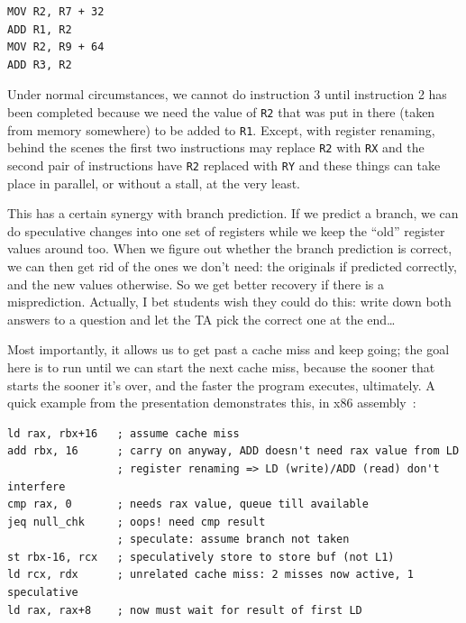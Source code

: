 \documentclass[a4paper]{report}
\begin{document}
\begin{verbatim}
MOV R2, R7 + 32
ADD R1, R2
MOV R2, R9 + 64
ADD R3, R2
\end{verbatim}

Under normal circumstances, we cannot do instruction 3 until instruction 2 has been completed because we need the value of \texttt{R2} that was put in there (taken from memory somewhere) to be added to \texttt{R1}. Except, with register renaming, behind the scenes the first two instructions may replace \texttt{R2} with \texttt{RX} and the second pair of instructions have \texttt{R2} replaced with \texttt{RY} and these things can take place in parallel, or without a stall, at the very least.

This has a certain synergy with branch prediction. If we predict a branch, we can do speculative changes into one set of registers while we keep the ``old'' register values around too. When we figure out whether the branch prediction is correct, we can then get rid of the ones we don't need: the originals if predicted correctly, and the new values otherwise. So we get better recovery if there is a misprediction. Actually, I bet students wish they could do this: write down both answers to a question and let the TA pick the correct one at the end\ldots

Most importantly, it allows us to get past a cache miss and keep going; the goal here is to run until we can start the next cache miss, because the sooner that starts the sooner it's over, and the faster the program executes, ultimately. A quick example from the presentation demonstrates this, in x86 assembly~\cite{modern-hardware}:

\begin{verbatim}
ld rax, rbx+16   ; assume cache miss
add rbx, 16      ; carry on anyway, ADD doesn't need rax value from LD
                 ; register renaming => LD (write)/ADD (read) don't interfere
cmp rax, 0       ; needs rax value, queue till available
jeq null_chk     ; oops! need cmp result
                 ; speculate: assume branch not taken
st rbx-16, rcx   ; speculatively store to store buf (not L1)
ld rcx, rdx      ; unrelated cache miss: 2 misses now active, 1 speculative
ld rax, rax+8    ; now must wait for result of first LD
\end{verbatim}
\end{document}
